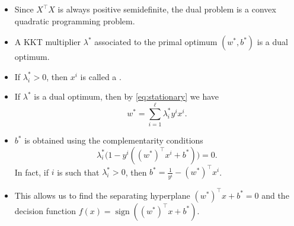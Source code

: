 \begin{remark}
    \begin{itemize}
        \item Since $X^\top X$ is always positive semidefinite, the dual problem is a convex quadratic programming problem.
        \item A KKT multiplier $\lambda^*$ associated to the primal optimum $(w^*, b^*)$ is a dual optimum.
        \item If $\lambda^*_i > 0$, then $x^i$ is called a .
        \item If $\lambda^*$ is a dual optimum, then by \cref{eq:stationary} we have
        \[
            w^* = \sum_{i=1}^{\ell} \lambda^*_i y^i x^i.
        \]
        \item $b^*$ is obtained using the complementarity conditions
        \[
            \lambda^*_i \bigl(1 - y^i ((w^*)^\top x^i + b^*)\bigr) = 0.
        \]
        In fact, if $i$ is such that $\lambda^*_i > 0$, then $b^* = \frac{1}{y^i} - (w^*)^\top x^i$.
        \item This allows us to find the separating hyperplane $(w^*)^\top x + b^* = 0$ and the decision function $f(x) = \operatorname{sign}((w^*)^\top x + b^*)$.
    \end{itemize}
\end{remark}
